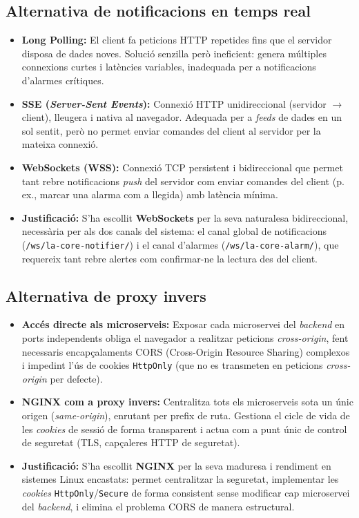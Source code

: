 \subsection{Alternativa de notificacions en temps real}
\begin{itemize}
  \item \textbf{Long Polling:} El client fa peticions HTTP repetides fins que el servidor disposa de dades noves. Solució senzilla però ineficient: genera múltiples connexions curtes i latències variables, inadequada per a notificacions d'alarmes crítiques.
  \item \textbf{SSE (\textit{Server-Sent Events}):} Connexió HTTP unidireccional (servidor $\rightarrow$ client), lleugera i nativa al navegador. Adequada per a \textit{feeds} de dades en un sol sentit, però no permet enviar comandes del client al servidor per la mateixa connexió.
  \item \textbf{WebSockets (WSS):} Connexió TCP persistent i bidireccional \cite{rfc6455} que permet tant rebre notificacions \textit{push} del servidor com enviar comandes del client (p. ex., marcar una alarma com a llegida) amb latència mínima.
  \item \textbf{Justificació:} S'ha escollit \textbf{WebSockets} per la seva naturalesa bidireccional, necessària per als dos canals del sistema: el canal global de notificacions (\texttt{/ws/la-core-\allowbreak{}notifier/}) i el canal d'alarmes (\texttt{/ws/la-core-alarm/}), que requereix tant rebre alertes com confirmar-ne la lectura des del client.
\end{itemize}

\subsection{Alternativa de proxy invers}
\begin{itemize}
  \item \textbf{Accés directe als microserveis:} Exposar cada microservei del \textit{backend} en ports independents obliga el navegador a realitzar peticions \textit{cross-origin}, fent necessaris encapçalaments CORS (Cross-Origin Resource Sharing) complexos i impedint l'ús de cookies \texttt{HttpOnly} (que no es transmeten en peticions \textit{cross-origin} per defecte).
  \item \textbf{NGINX com a proxy invers:} Centralitza tots els microserveis sota un únic origen (\textit{same-origin}), enrutant per prefix de ruta. Gestiona el cicle de vida de les \textit{cookies} de sessió de forma transparent i actua com a punt únic de control de seguretat (TLS, capçaleres HTTP de seguretat).
  \item \textbf{Justificació:} S'ha escollit \textbf{NGINX} \cite{nginx_admin} per la seva maduresa i rendiment en sistemes Linux encastats: permet centralitzar la seguretat, implementar les \textit{cookies} \texttt{HttpOnly}/\texttt{Secure} de forma consistent sense modificar cap microservei del \textit{backend}, i elimina el problema CORS de manera estructural.
\end{itemize}

